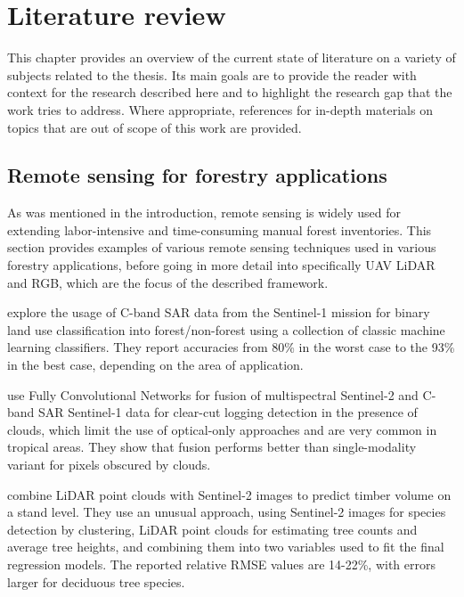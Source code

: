 \chapter{Literature review}\label{cap:literature}

This chapter provides an overview of the current state of literature on a variety of subjects related to the thesis.
Its main goals are to provide the reader with context for the research described here and to highlight the research gap that the work tries to address.
Where appropriate, references for in-depth materials on topics that are out of scope of this work are provided.

\section{Remote sensing for forestry applications}

As was mentioned in the introduction, remote sensing is widely used for extending labor-intensive and time-consuming manual forest inventories.
This section provides examples of various remote sensing techniques used in various forestry applications, before going in more detail into specifically UAV LiDAR and RGB, which are the focus of the described framework.

\citet{hansenAssessingForestNonForest2020} explore the usage of C-band SAR data from the Sentinel-1 mission for binary land use classification into forest/non-forest using a collection of classic machine learning classifiers.
They report accuracies from 80\% in the worst case to the 93\% in the best case, depending on the area of application.

\citet{ferrariFusingSentinel1Sentinel22023} use Fully Convolutional Networks \citep{longFullyConvolutionalNetworks2015} for fusion of multispectral Sentinel-2 and C-band SAR Sentinel-1 data for clear-cut logging detection in the presence of clouds, which limit the use of optical-only approaches and are very common in tropical areas.
They show that fusion performs better than single-modality variant for pixels obscured by clouds.

\citet{sinica-sinavskisForestStandVolume2022} combine LiDAR point clouds with Sentinel-2 images to predict timber volume on a stand level.
They use an unusual approach, using Sentinel-2 images for species detection by clustering, LiDAR point clouds for estimating tree counts and average tree heights, and combining them into two variables used to fit the final regression models.
The reported relative RMSE values are 14-22\%, with errors larger for deciduous tree species.

